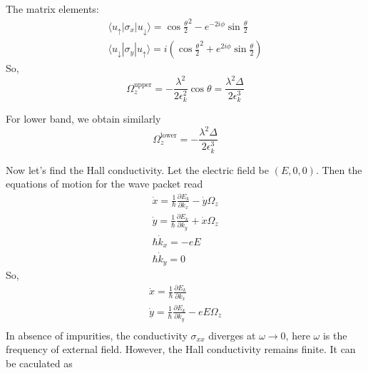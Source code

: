 \documentclass{article}
\newcommand{\p}{\partial}
\begin{document}
The matrix elements:
\begin{equation}
    \begin{gathered}
        \langle u_\uparrow | \sigma_x | u_\downarrow \rangle = 
            \cos{\frac{\theta}{2}}^2 - e^{-2i\phi}\sin{\frac{\theta}{2}} \\
        \langle u_\downarrow|\sigma_y |u_\uparrow\rangle = 
            i(\cos{\frac{\theta}{2}}^2 + e^{2i\phi}\sin{\frac{\theta}{2}})
    \end{gathered}
\end{equation}
So,
\begin{equation}
    \Omega_z^{\mathrm{upper}} = -\frac{\lambda^2}{2\epsilon_k^2} \cos{\theta} = 
            \frac{\lambda^2 \Delta}{2\epsilon_k^3}
\end{equation}

For lower band, we obtain similarly
\begin{equation}
    \Omega_z^{\mathrm{lower}} = 
            -\frac{\lambda^2 \Delta}{2\epsilon_k^3}
\end{equation}

Now let's find the Hall conductivity. Let the electric field be $(E, 0, 0)$. Then the equations of motion for the wave packet read
\begin{equation}
    \begin{gathered}
        \dot{x} = \frac{1}{\hbar}\frac{\p E_k}{\p k_x} - \dot{y}\Omega_z\\
        \dot{y} = \frac{1}{\hbar}\frac{\p E_k}{\p k_y} + \dot{x}\Omega_z\\
        \hbar\dot{k}_x = -eE\\
        \hbar\dot{k}_y = 0
    \end{gathered}
\end{equation}
So, 
\begin{equation}
    \begin{gathered}
        \dot{x} = \frac{1}{\hbar}\frac{\p E_k}{\p k_x}\\
        \dot{y} = \frac{1}{\hbar}\frac{\p E_k}{\p k_y} -eE\Omega_z\\
    \end{gathered}
\end{equation}
In absence of impurities, the conductivity $\sigma_{xx}$ diverges at $\omega \to 0$, here
$\omega$ is the frequency of external field. However, the Hall conductivity remains finite. 
It can be caculated as 
\end{document}
